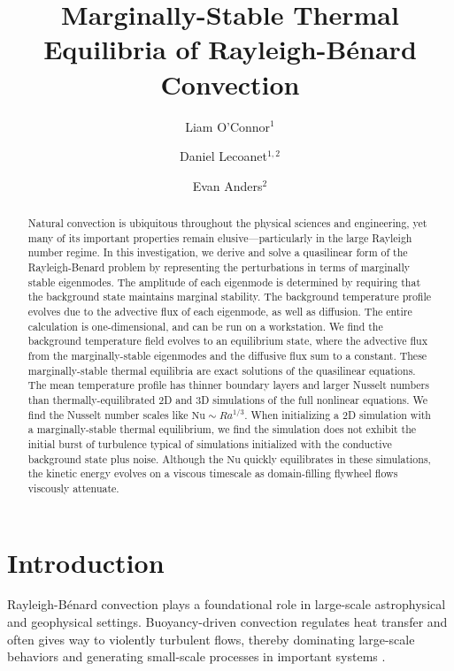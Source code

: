 \documentclass[reprint,amsmath,amssymb,aps]{revtex4-1}
\newcommand\Nu{\mathrm{Nu}}
\begin{document}
\title{Marginally-Stable Thermal Equilibria of Rayleigh-Bénard Convection}

\author{Liam O'Connor$^1$}
\author{Daniel Lecoanet$^{1, 2}$}
\author{Evan Anders$^2$}

\begin{abstract}
Natural convection is ubiquitous throughout the physical sciences and engineering, yet many of its important properties remain elusive---particularly in the large Rayleigh number regime.
In this investigation, we derive and solve a quasilinear form of the Rayleigh-Benard problem by representing the perturbations in terms of marginally stable eigenmodes.
The amplitude of each eigenmode is determined by requiring that the background state maintains marginal stability.
The background temperature profile evolves due to the advective flux of each eigenmode, as well as diffusion.
The entire calculation is one-dimensional, and can be run on a workstation.
We find the background temperature field evolves to an equilibrium state, where the advective flux from the marginally-stable eigenmodes and the diffusive flux sum to a constant.
These marginally-stable thermal equilibria are exact solutions of the quasilinear equations.
The mean temperature profile has thinner boundary layers and larger Nusselt numbers than thermally-equilibrated 2D and 3D simulations of the full nonlinear equations.
We find the Nusselt number scales like $\Nu \sim Ra^{1/3}$.
When initializing a 2D simulation with a marginally-stable thermal equilibrium, we find the simulation does not exhibit the initial burst of turbulence typical of simulations initialized with the conductive background state plus noise.
Although the $\Nu$ quickly equilibrates in these simulations, the kinetic energy evolves on a viscous timescale as domain-filling flywheel flows viscously attenuate.
\end{abstract}


\maketitle

\section{Introduction}
Rayleigh-B\'enard convection plays a foundational role in large-scale astrophysical and geophysical settings.
Buoyancy-driven convection regulates heat transfer and often gives way to violently turbulent flows, thereby dominating large-scale behaviors and generating small-scale processes in important systems \cite{Couston}.
\end{document}

